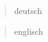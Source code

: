 \begin{abstract}
deutsch
\end{abstract}

\renewcommand\abstractname{Abstract} 
\begin{abstract}
englisch
\end{abstract}
